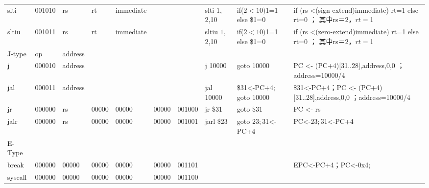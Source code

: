 \documentclass[12pt,a4paper]{article}
\begin{document}
\begin{landscape}
\begin{table}[]
{\begin{tabular}{llllllllll}
slti    & 001010 & rs      & rt    & immediate &       &        & slti $1,$2,10  & if($2<10) $1=1 else   \$1=0                & if (rs \textless{}(sign-extend)immediate)   rt=1 else rt=0 ；   其中rs＝$2，rt=$1                 \\
sltiu   & 001011 & rs      & rt    & immediate &       &        & sltiu $1,$2,10 & if($2<10)   $1=1 else   \$1=0              & if (rs \textless{}(zero-extend)immediate)   rt=1 else rt=0 ；  其中rs＝$2，rt=$1                  \\
J-type  & op     & address &       &           &       &        &                &                                            &                                                                                              \\
j       & 000010 & address &       &           &       &        & j 10000        & goto 10000                                 & PC \textless{}-   (PC+4){[}31..28{]},address,0,0   ；address=10000/4                          \\
jal     & 000011 & address &       &           &       &        & jal 10000      & \$31\textless{}-PC+4; goto 10000           & \$31\textless{}-PC+4；PC \textless{}-   (PC+4){[}31..28{]},address,0,0   ；address=10000/4     \\
jr      & 000000 & rs      & 00000 & 00000     & 00000 & 001000 & jr \$31        & goto \$31                                  & PC \textless{}- rs                                                                           \\
jalr    & 000000 & rs      & 00000 & 00000     & 00000 & 001001 & jarl \$23      & goto $23;$31\textless{}-PC+4               & PC\textless{}-$23;$31\textless{}-PC+4                                                        \\
E-Type  &        &         &       &           &       &        &                &                                            &                                                                                              \\
break   & 000000 & 00000   & 00000 & 00000     & 00000 & 001101 &                &                                            & EPC\textless{}-PC+4；PC\textless{}-0x4;                                                       \\
syscall & 000000 & 00000   & 00000 & 00000     & 00000 & 001100 &                &                                            &                                                                                              \\

\end{tabular}}
\end{table}
\end{landscape}
\end{document}

